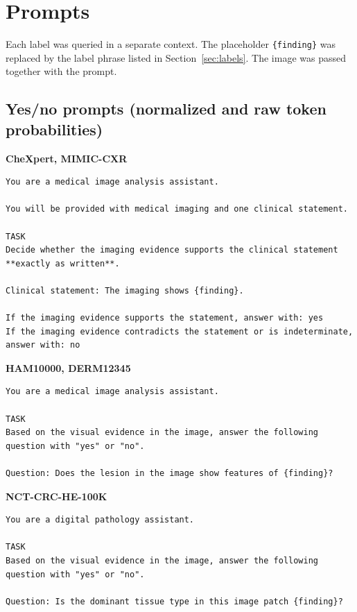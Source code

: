 \section{Prompts}\label{sec:prompts}
Each label was queried in a separate context. The placeholder \texttt{\{finding\}} was replaced by the label phrase listed in Section~\ref{sec:labels}. The image was passed together with the prompt.

\subsection{Yes/no prompts (normalized and raw token probabilities)}
\noindent\begin{minipage}{\linewidth}
\textbf{CheXpert, MIMIC-CXR}
\begin{lstlisting}
You are a medical image analysis assistant.

You will be provided with medical imaging and one clinical statement.  

TASK  
Decide whether the imaging evidence supports the clinical statement **exactly as written**.

Clinical statement: The imaging shows {finding}.

If the imaging evidence supports the statement, answer with: yes  
If the imaging evidence contradicts the statement or is indeterminate, answer with: no
\end{lstlisting}
\end{minipage}
\medskip

\noindent\begin{minipage}{\linewidth}
\textbf{HAM10000, DERM12345}
\begin{lstlisting}
You are a medical image analysis assistant.

TASK
Based on the visual evidence in the image, answer the following question with "yes" or "no".

Question: Does the lesion in the image show features of {finding}?
\end{lstlisting}
\end{minipage}
\medskip

\noindent\begin{minipage}{\linewidth}
\textbf{NCT-CRC-HE-100K}
\begin{lstlisting}
You are a digital pathology assistant.

TASK
Based on the visual evidence in the image, answer the following question with "yes" or "no".

Question: Is the dominant tissue type in this image patch {finding}?
\end{lstlisting}
\end{minipage}
\medskip

